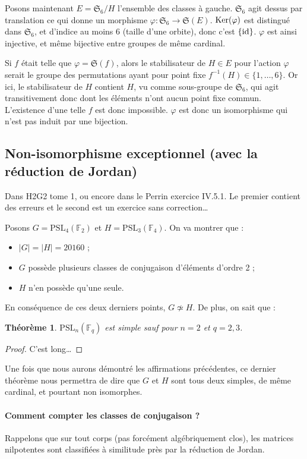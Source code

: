 \documentclass[a4paper, 11pt]{article}
\def\F{\mathbb{F}}
\def\Sigmap{\mathfrak{S}}
\def\Ker{\textnormal{Ker}}
\def\PSL{\mathrm{PSL}}
\newtheorem*{theorem}{Théorème}
\begin{document}
Posons maintenant $E = \Sigmap_6/H$ l'ensemble des classes à gauche. $\Sigmap_6$
agit dessus par translation ce qui donne un morphisme $\varphi : \Sigmap_6 \to
\Sigmap(E)$. $\Ker(\varphi)$ est distingué dans $\Sigmap_6$, et d'indice au moins 6
(taille d'une orbite), donc c'est $\{\textnormal{id}\}$. $\varphi$ est ainsi
injective, et même bijective entre groupes de même cardinal.

Si $f$ était telle que $\varphi = \Sigmap(f)$, alors le stabilisateur de $H \in E$
pour l'action $\varphi$ serait le groupe des permutations ayant pour point fixe
$f^{-1}(H) \in \{1,\ldots,6\}$. Or ici, le stabilisateur de $H$ contient $H$, vu
comme sous-groupe de $\Sigmap_6$, qui agit transitivement donc dont les éléments
n'ont aucun point fixe commun. L'existence d'une telle $f$ est donc impossible.
$\varphi$ est donc un isomorphisme qui n'est pas induit par une bijection.

\newpage

\subsection{Non-isomorphisme exceptionnel (avec la réduction de Jordan)}

Dans H2G2 tome 1, ou encore dans le Perrin exercice IV.5.1. Le premier contient
des erreurs et le second est un exercice sans correction…

Posons $G = \PSL_4(\F_2)$ et $H = \PSL_3(\F_4)$. On va montrer que :
\begin{itemize}
\item $|G| = |H| = 20160$ ;
\item $G$ possède plusieurs classes de conjugaison d'éléments d'ordre 2 ;
\item $H$ n'en possède qu'une seule.
\end{itemize}
En conséquence de ces deux derniers points, $G \not\simeq H$. De plus, on sait
que :
\begin{theorem}
  $\PSL_n(\F_q)$ est simple sauf pour $n = 2$ et $q = 2,3$.
\end{theorem}
\begin{proof}
  C'est long…
\end{proof}
Une fois que nous aurons démontré les affirmations précédentes, ce dernier
théorème nous permettra de dire que $G$ et $H$ sont tous deux simples, de même
cardinal, et pourtant non isomorphes.

\paragraph{Comment compter les classes de conjugaison ?} Rappelons que sur tout
corps (pas forcément algébriquement clos), les matrices nilpotentes sont
classifiées à similitude près par la réduction de Jordan.
\end{document}
